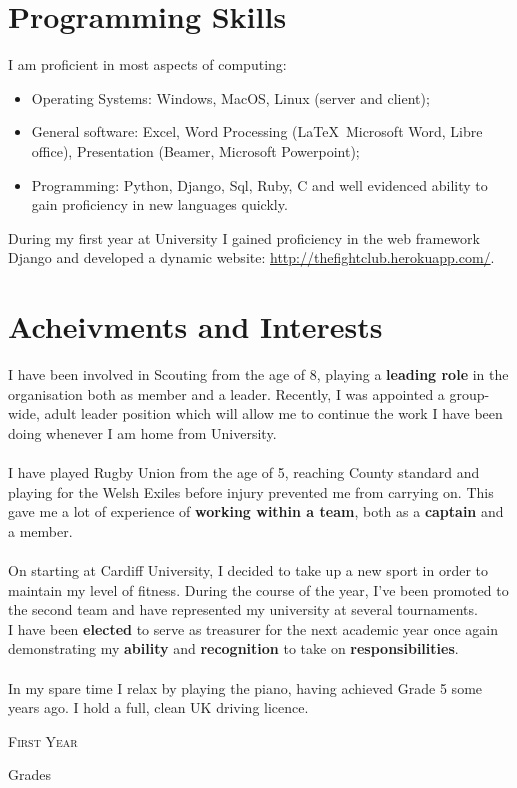 \documentclass[a4paper]{article}
\begin{document}
\section{Programming Skills}
I am proficient in most aspects of computing:

\begin{itemize}
    \item Operating Systems: Windows, MacOS, Linux (server and client);
    \item General software: Excel, Word Processing (\LaTeX\, Microsoft Word, Libre office), Presentation (Beamer, Microsoft Powerpoint);
    \item Programming: Python, Django, Sql, Ruby, C and well evidenced ability to gain proficiency in new languages quickly.
\end{itemize}

During my first year at University I gained proficiency in the web framework Django and developed a dynamic website: \url{http://thefightclub.herokuapp.com/}.
\section{Acheivments and Interests}
I have been involved in Scouting from the age of 8, playing a \textbf{leading role} in the organisation both as member and a leader.
Recently, I was appointed a group-wide, adult leader position which will allow me to continue the work I have been doing whenever I am home from University. \\
\\
I have played Rugby Union from the age of 5, reaching County standard and playing for the Welsh Exiles before injury prevented me from carrying on.
This gave me a lot of experience of \textbf{working within a team}, both as a \textbf{captain} and a member. \\
\\
On starting at Cardiff University, I decided to take up a new sport in order to maintain my level of fitness.
During the course of the year, I've been promoted to the second team and have represented my university at several tournaments. \\
I have been \textbf{elected} to serve as treasurer for the next academic year once again demonstrating my \textbf{ability} and \textbf{recognition} to take on \textbf{responsibilities}.\\
\\
In my spare time I relax by playing the piano, having achieved Grade 5 some years ago. I hold a full, clean UK driving licence.
\bigskip
\par{\centering\Large {\textsc{First Year}}
\par}\large{\centering Grades\par}\normalsize
\end{document}
